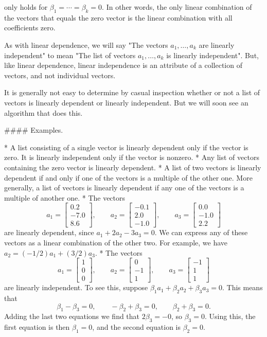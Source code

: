 only holds for \(\beta_{1}=\cdots=\beta_{k}=0\). In other words, the only linear combination of the vectors that equals the zero vector is the linear combination with all coefficients zero.

As with linear dependence, we will say "The vectors \(a_{1},\ldots,a_{k}\) are linearly independent" to mean "The list of vectors \(a_{1},\ldots,a_{k}\) is linearly independent". But, like linear dependence, linear independence is an attribute of a collection of vectors, and not individual vectors.

It is generally not easy to determine by casual inspection whether or not a list of vectors is linearly dependent or linearly independent. But we will soon see an algorithm that does this.

#### Examples.

* A list consisting of a single vector is linearly dependent only if the vector is zero. It is linearly independent only if the vector is nonzero.
* Any list of vectors containing the zero vector is linearly dependent.
* A list of two vectors is linearly dependent if and only if one of the vectors is a multiple of the other one. More generally, a list of vectors is linearly dependent if any one of the vectors is a multiple of another one.
* The vectors \[a_{1}=\left[\begin{array}{c}0.2\\ -7.0\\ 8.6\end{array}\right],\qquad a_{2}=\left[\begin{array}{c}-0.1\\ 2.0\\ -1.0\end{array}\right],\qquad a_{3}=\left[\begin{array}{c}0.0\\ -1.0\\ 2.2\end{array}\right]\] are linearly dependent, since \(a_{1}+2a_{2}-3a_{3}=0\). We can express any of these vectors as a linear combination of the other two. For example, we have \(a_{2}=(-1/2)a_{1}+(3/2)a_{3}\).
* The vectors \[a_{1}=\left[\begin{array}{c}1\\ 0\\ 0\end{array}\right],\qquad a_{2}=\left[\begin{array}{c}0\\ -1\\ 1\end{array}\right],\qquad a_{3}=\left[\begin{array}{c}-1\\ 1\\ 1\end{array}\right]\] are linearly independent. To see this, suppose \(\beta_{1}a_{1}+\beta_{2}a_{2}+\beta_{3}a_{3}=0\). This means that \[\beta_{1}-\beta_{3}=0,\qquad-\beta_{2}+\beta_{3}=0,\qquad\beta_{2}+\beta_{3}=0.\] Adding the last two equations we find that \(2\beta_{3}=-0\), so \(\beta_{3}=0\). Using this, the first equation is then \(\beta_{1}=0\), and the second equation is \(\beta_{2}=0\).
